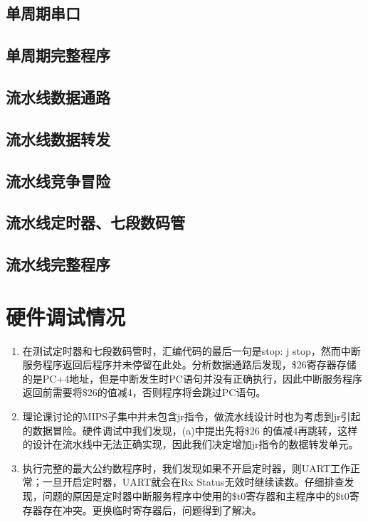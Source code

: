 \documentclass{article}
\begin{document}
        \subsection{单周期串口}
        
        \subsection{单周期完整程序}
        
        \subsection{流水线数据通路}
        
        \subsection{流水线数据转发}
        
        \subsection{流水线竞争冒险}
        
        \subsection{流水线定时器、七段数码管}
        
        \subsection{流水线完整程序}
        
        
    \section{硬件调试情况}
        \begin{enumerate}
          \item 在测试定时器和七段数码管时，汇编代码的最后一句是stop: j stop，然而中断服务程序返回后程序并未停留在此处。分析数据通路后发现，\$26寄存器存储的是PC+4地址，但是中断发生时PC语句并没有正确执行，因此中断服务程序返回前需要将\$26的值减4，否则程序将会跳过PC语句。
          \item 理论课讨论的MIPS子集中并未包含jr指令，做流水线设计时也为考虑到jr引起的数据冒险。硬件调试中我们发现，(a)中提出先将\$26 的值减4再跳转，这样的设计在流水线中无法正确实现，因此我们决定增加jr指令的数据转发单元。
          \item 执行完整的最大公约数程序时，我们发现如果不开启定时器，则UART工作正常；一旦开启定时器，UART就会在Rx Status无效时继续读数。仔细排查发现，问题的原因是定时器中断服务程序中使用的\$t0寄存器和主程序中的\$t0寄存器存在冲突。更换临时寄存器后，问题得到了解决。
        \end{enumerate}
\end{document}

